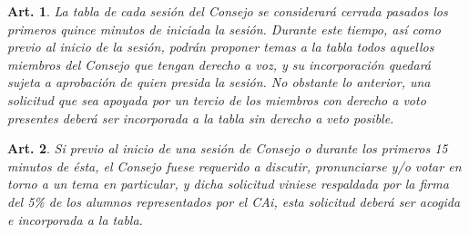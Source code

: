 \documentclass[letterpaper,11pt]{article}
\theoremstyle{plain}
\newtheorem{art}{Art.} %
\begin{document}
			\begin{art}\label{definicionTabla}
				La tabla de cada sesión del Consejo se considerará cerrada pasados los primeros quince minutos de iniciada la sesión. Durante este tiempo, así como previo al inicio de la sesión, podrán proponer temas a la tabla todos aquellos miembros del Consejo que tengan derecho a voz, y su incorporación quedará sujeta a aprobación de quien presida la sesión. No obstante lo anterior, una solicitud que sea apoyada por un tercio de los miembros con derecho a voto presentes deberá ser incorporada a la tabla sin derecho a veto posible.
			\end{art}

			\begin{art}\label{temaPropuestoAlumnado}
				Si previo al inicio de una sesión de Consejo o durante los primeros 15 minutos de ésta, el Consejo fuese requerido a discutir, pronunciarse y/o votar en torno a un tema en particular, y dicha solicitud viniese respaldada por la firma del 5\% de los alumnos representados por el CAi, esta solicitud deberá ser acogida e incorporada a la tabla.
			\end{art}
\end{document}

